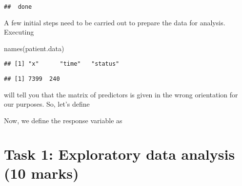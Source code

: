 \documentclass[
]{article}
\newenvironment{Shaded}{\begin{snugshade}}{\end{snugshade}}
\newcommand{\AttributeTok}[1]{\textcolor[rgb]{0.77,0.63,0.00}{#1}}
\newcommand{\DecValTok}[1]{\textcolor[rgb]{0.00,0.00,0.81}{#1}}
\newcommand{\FunctionTok}[1]{\textcolor[rgb]{0.00,0.00,0.00}{#1}}
\newcommand{\NormalTok}[1]{#1}
\newcommand{\OtherTok}[1]{\textcolor[rgb]{0.56,0.35,0.01}{#1}}
\newcommand{\SpecialCharTok}[1]{\textcolor[rgb]{0.00,0.00,0.00}{#1}}
\newcommand{\StringTok}[1]{\textcolor[rgb]{0.31,0.60,0.02}{#1}}
\begin{document}
\begin{verbatim}
##  done
\end{verbatim}

A few initial steps need to be carried out to prepare the data for
analysis. Executing

\begin{Shaded}
\begin{Highlighting}[]
\FunctionTok{names}\NormalTok{(patient.data)}
\end{Highlighting}
\end{Shaded}

\begin{verbatim}
## [1] "x"      "time"   "status"
\end{verbatim}

\begin{Shaded}
\end{Shaded}

\begin{verbatim}
## [1] 7399  240
\end{verbatim}

will tell you that the matrix of predictors is given in the wrong
orientation for our purposes. So, let's define

\begin{Shaded}
\end{Shaded}

Now, we define the response variable as

\begin{Shaded}
\end{Shaded}

\hypertarget{task-1-exploratory-data-analysis-10-marks}{%
\section{Task 1: Exploratory data analysis (10
marks)}\label{task-1-exploratory-data-analysis-10-marks}}
\end{document}
